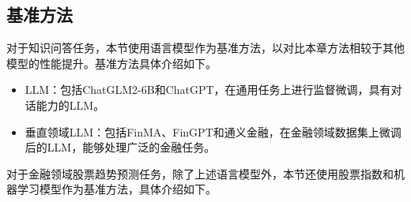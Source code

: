 

\subsection{基准方法}

对于知识问答任务，本节使用语言模型作为基准方法，以对比本章方法相较于其他模型的性能提升。基准方法具体介绍如下。

\begin{itemize}[topsep = 0 pt, itemsep= 0 pt, parsep=0pt, partopsep=0pt, leftmargin=36pt, itemindent=0pt, labelsep=6pt, listparindent=24pt]
	\item LLM：包括ChatGLM2-6B\cite{DBLP:conf/iclr/ZengLDWL0YXZXTM23}和ChatGPT\cite{DBLP:conf/nips/Ouyang0JAWMZASR22}，在通用任务上进行监督微调，具有对话能力的LLM。
	\item 垂直领域LLM：包括FinMA\cite{DBLP:journals/corr/abs-2306-05443}、FinGPT\cite{DBLP:journals/corr/abs-2306-06031}和通义金融\cite{DBLP:journals/corr/abs-2309-16609}，在金融领域数据集上微调后的LLM，能够处理广泛的金融任务。
\end{itemize}

对于金融领域股票趋势预测任务，除了上述语言模型外，本节还使用股票指数和机器学习模型作为基准方法，具体介绍如下。

